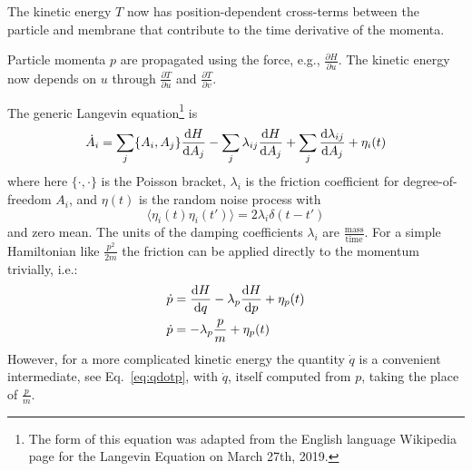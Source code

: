 The kinetic energy $T$ now has position-dependent cross-terms between the particle and membrane that contribute to the time derivative of the momenta.


Particle momenta $p$ are propagated using the force, e.g., $\frac{\partial{H}}{\partial{u}}$.
The kinetic energy now depends on $u$ through $\frac{\partial T}{\partial u}$ and $\frac{\partial T}{\partial v}$.






The generic Langevin equation\footnote{The form of this equation was adapted from the English language Wikipedia page for the Langevin Equation on March 27th, 2019.}
is
\begin{equation}
\dot{A}_i = \sum_j \{ A_i, A_j \} \frac{\textrm{d} H}{\textrm{d} A_j} - \sum_j \lambda_{ij} \frac{\textrm{d} H}{\textrm{d} A_j} + \sum_j \frac{ \textrm{d} \lambda_{ij} }{\textrm{d} A_j} + \eta_i(t)
\end{equation}
where here $\{ \cdot, \cdot \}$ is the Poisson bracket, $\lambda_i$ is the friction coefficient for degree-of-freedom $A_i$, and $\eta(t)$ is the random noise process with
\begin{equation}
\langle \eta_i(t) \eta_i(t') \rangle = 2 \lambda_i \delta(t-t')
\end{equation}
and zero mean.
The units of the damping coefficients $\lambda_i$ are $\frac{\textrm{mass}}{\textrm{time}}$.
For a simple Hamiltonian like $\frac{p^2}{2 m}$ the friction can be applied directly to the momentum trivially, i.e.:
\begin{align}
\dot{p} &= \frac{\textrm{d} H}{\textrm{d} q} - \lambda_p \frac{\textrm{d} H}{\textrm{d} p} + \eta_p(t) \\
\dot{p} &= - \lambda_p \frac{p}{m} + \eta_p(t) 
\end{align}
However, for a more complicated kinetic energy the quantity $\dot{q}$ is a convenient intermediate, see Eq.~\ref{eq:qdotp}, with $\dot{q}$, itself computed from $p$, taking the place of $\frac{p}{m}$. 


%
%
%



